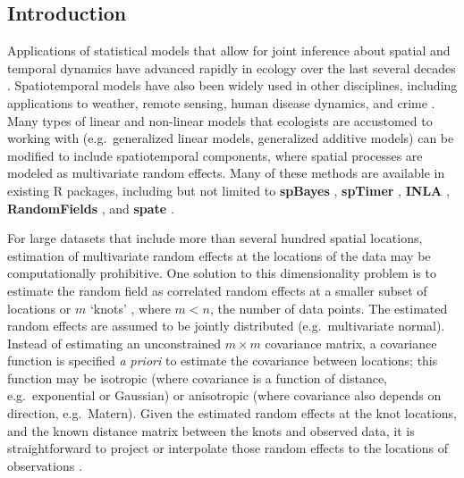 \documentclass[12pt,english]{article}
\begin{document}
\begin{spacing}{1.25}
\section{Introduction}

Applications of statistical models that allow for joint inference about spatial
and temporal dynamics have advanced rapidly in ecology over the last several
decades \citep{bascompte1995, latimer2009}. Spatiotemporal models have also
been widely used in other disciplines, including applications to weather,
remote sensing, human disease dynamics, and crime \citep{cressie2011}. Many
types of linear and non-linear models that ecologists are accustomed to working
with (e.g.~generalized linear models, generalized additive models) can be
modified to include spatiotemporal components, where spatial processes are
modeled as multivariate random effects. Many of these methods are available in
existing R packages, including but not limited to \textbf{spBayes}
\citep{finley2007}, \textbf{spTimer} \citep{bakar2015}, \textbf{INLA}
\citep{rue2009}, \textbf{RandomFields} \citep{schlather2016}, and
\textbf{spate} \citep{sigrist2015}.

For large datasets that include more than several hundred spatial locations,
estimation of multivariate random effects at the locations of the data may be
computationally prohibitive. One solution to this dimensionality problem is to
estimate the random field as correlated random effects at a smaller subset of
locations or $m$ `knots' \citep[e.g.][]{latimer2009, shelton2014}, where $m
  < n$, the number of data points. The estimated random effects are assumed to
be jointly distributed (e.g.~multivariate normal). Instead of estimating an
unconstrained $m \times m$ covariance matrix, a covariance function is
specified \emph{a priori} to estimate the covariance between locations; this
function may be isotropic (where covariance is a function of distance,
e.g.~exponential or Gaussian) or anisotropic (where covariance also depends on
direction, e.g.~Matern). Given the estimated random effects at the knot
locations, and the known distance matrix between the knots and observed data,
it is straightforward to project or interpolate those random effects to the
locations of observations \citep{latimer2009, finley2009}.


\end{spacing}
\end{document}
